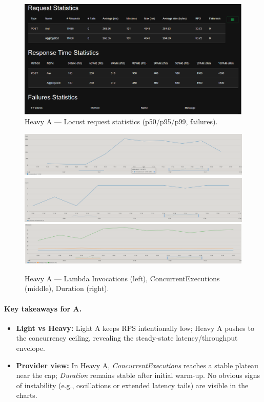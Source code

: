 \documentclass[11pt,a4paper]{article}
\begin{document}
\begin{figure}[h!] \centering
  \includegraphics[width=\linewidth]{"figures/hA - Stats.png"}
  \caption{Heavy A --- Locust request statistics (p50/p95/p99, failures).}
\end{figure}

\begin{figure}[h!] \centering
  \includegraphics[width=.32\linewidth]{"figures/hA - Invocations.png"}\hfill
  \includegraphics[width=.32\linewidth]{"figures/hA - ConcEx.png"}\hfill
  \includegraphics[width=.32\linewidth]{"figures/hA - Durations.png"}
  \caption{Heavy A --- Lambda Invocations (left), ConcurrentExecutions (middle), Duration (right).}
\end{figure}

\paragraph{Key takeaways for A.}
\begin{itemize}
  \item \textbf{Light vs Heavy:} Light A keeps RPS intentionally low; Heavy A pushes to the concurrency ceiling, revealing the steady-state latency/throughput envelope.
  \item \textbf{Provider view:} In Heavy A, \emph{ConcurrentExecutions} reaches a stable plateau near the cap; \emph{Duration} remains stable after initial warm-up. No obvious signs of instability (e.g., oscillations or extended latency tails) are visible in the charts.
\end{itemize}
\end{document}
